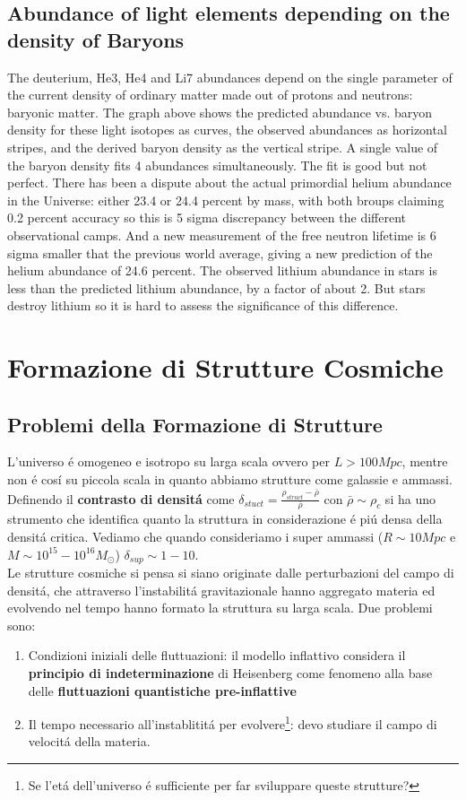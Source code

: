 \documentclass[12pt, a4paper]{article}
\begin{document}
\subsection{Abundance of light elements depending on the density of Baryons}
The deuterium, He3, He4 and Li7 abundances depend on the single parameter of the current density of ordinary matter made out of protons and neutrons: baryonic matter. The graph above shows the predicted abundance vs. baryon density for these light isotopes as curves, the observed abundances as horizontal stripes, and the derived baryon density as the vertical stripe. A single value of the baryon density fits 4 abundances simultaneously. The fit is good but not perfect. There has been a dispute about the actual primordial helium abundance in the Universe: either 23.4 or 24.4 percent by mass, with both broups claiming 0.2 percent accuracy so this is 5 sigma discrepancy between the different observational camps. And a new measurement of the free neutron lifetime is 6 sigma smaller that the previous world average, giving a new prediction of the helium abundance of 24.6 percent. The observed lithium abundance in stars is less than the predicted lithium abundance, by a factor of about 2. But stars destroy lithium so it is hard to assess the significance of this difference. 
\newpage
\section{Formazione di Strutture Cosmiche}
\subsection{Problemi della Formazione di Strutture}
L'universo \'{e} omogeneo e isotropo su larga scala ovvero per $L>100Mpc$, mentre non \'{e} cos\'{i} su piccola scala in quanto abbiamo strutture come galassie e ammassi. Definendo il \textbf{contrasto di densit\'{a}} come  $\delta_{stuct}=\frac{\rho_{struct}-\bar{\rho}}{\bar{\rho}}$ con $\bar{\rho}\sim \rho_c$ si ha uno strumento che identifica quanto la struttura in considerazione \'{e} pi\'{u} densa della densit\'{a} critica. Vediamo che quando consideriamo i super ammassi ($R\sim 10Mpc$ e $M\sim 10^{15}-10^{16} M_{\odot}$)  $\delta_{sup}\sim 1-10$. \\Le strutture cosmiche si pensa si siano originate dalle perturbazioni del campo di densit\'{a}, che attraverso l'instabilit\'{a} gravitazionale hanno aggregato materia ed evolvendo nel tempo hanno formato la struttura su larga scala. Due problemi sono:
\begin{enumerate}
\item Condizioni iniziali delle fluttuazioni: il modello inflattivo considera il \textbf{principio di indeterminazione} di Heisenberg come fenomeno alla base delle \textbf{fluttuazioni quantistiche pre-inflattive}
\item Il tempo necessario all'instablitit\'{a} per evolvere\footnote{Se l'et\'{a} dell'universo \'{e} sufficiente per far sviluppare queste strutture?}: devo studiare il campo di velocit\'{a} della materia.
\end{enumerate}
\end{document}
